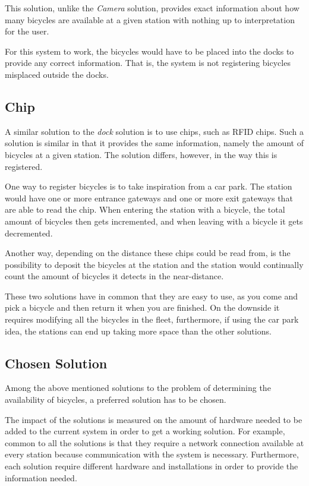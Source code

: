 This solution, unlike the \textit{Camera} solution, provides exact information about how many bicycles are available at a given station with nothing up to interpretation for the user.

For this system to work, the bicycles would have to be placed into the docks to provide any correct information.
That is, the system is not registering bicycles misplaced outside the docks.

\subsection{Chip}
A similar solution to the \textit{dock} solution is to use chips, such as RFID chips. 
Such a solution is similar in that it provides the same information, namely the amount of bicycles at a given station.
The solution differs, however, in the way this is registered.

One way to register bicycles is to take inspiration from a car park.
The station would have one or more entrance gateways and one or more exit gateways that are able to read the chip.
When entering the station with a bicycle, the total amount of bicycles then gets incremented, and when leaving with a bicycle it gets decremented.

Another way, depending on the distance these chips could be read from, is the possibility to deposit the bicycles at the station and the station would continually count the amount of bicycles it detects in the near-distance.

These two solutions have in common that they are easy to use, as you come and pick a bicycle and then return it when you are finished.
On the downside it requires modifying all the bicycles in the fleet, furthermore, if using the car park idea, the stations can end up taking more space than the other solutions. 

\subsection{Chosen Solution}
Among the above mentioned solutions to the problem of determining the availability of bicycles, a preferred solution has to be chosen. 

The impact of the solutions is measured on the amount of hardware needed to be added to the current system in order to get a working solution. 
For example, common to all the solutions is that they require a network connection available at every station because communication with the system is necessary. 
Furthermore, each solution require different hardware and installations in order to provide the information needed. 

